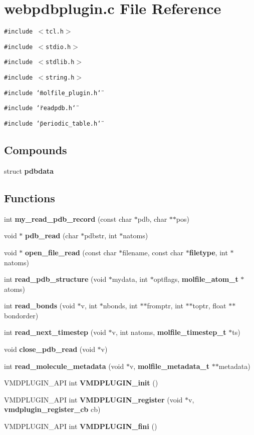 \section{webpdbplugin.c File Reference}
\label{webpdbplugin_8c}
{\tt \#include $<$tcl.h$>$}\par
{\tt \#include $<$stdio.h$>$}\par
{\tt \#include $<$stdlib.h$>$}\par
{\tt \#include $<$string.h$>$}\par
{\tt \#include \char`\"{}molfile\_\-plugin.h\char`\"{}}\par
{\tt \#include \char`\"{}readpdb.h\char`\"{}}\par
{\tt \#include \char`\"{}periodic\_\-table.h\char`\"{}}\par
\subsection*{Compounds}
\begin{CompactItemize}
\item 
struct {\bf pdbdata}
\end{CompactItemize}
\subsection*{Functions}
\begin{CompactItemize}
\item 
int {\bf my\_\-read\_\-pdb\_\-record} (const char $\ast$pdb, char $\ast$$\ast$pos)
\item 
void $\ast$ {\bf pdb\_\-read} (char $\ast$pdbstr, int $\ast$natoms)
\item 
void $\ast$ {\bf open\_\-file\_\-read} (const char $\ast$filename, const char $\ast${\bf filetype}, int $\ast$natoms)
\item 
int {\bf read\_\-pdb\_\-structure} (void $\ast$mydata, int $\ast$optflags, {\bf molfile\_\-atom\_\-t} $\ast$atoms)
\item 
int {\bf read\_\-bonds} (void $\ast$v, int $\ast$nbonds, int $\ast$$\ast$fromptr, int $\ast$$\ast$toptr, float $\ast$$\ast$bondorder)
\item 
int {\bf read\_\-next\_\-timestep} (void $\ast$v, int natoms, {\bf molfile\_\-timestep\_\-t} $\ast$ts)
\item 
void {\bf close\_\-pdb\_\-read} (void $\ast$v)
\item 
int {\bf read\_\-molecule\_\-metadata} (void $\ast$v, {\bf molfile\_\-metadata\_\-t} $\ast$$\ast$metadata)
\item 
VMDPLUGIN\_\-API int {\bf VMDPLUGIN\_\-init} ()
\item 
VMDPLUGIN\_\-API int {\bf VMDPLUGIN\_\-register} (void $\ast$v, {\bf vmdplugin\_\-register\_\-cb} cb)
\item 
VMDPLUGIN\_\-API int {\bf VMDPLUGIN\_\-fini} ()
\end{CompactItemize}
